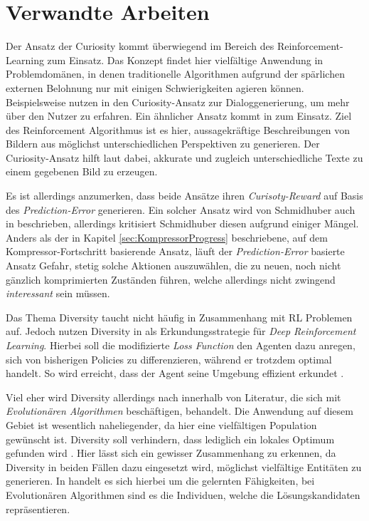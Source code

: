 
\section{Verwandte Arbeiten}
\label{sec:related}

Der Ansatz der Curiosity kommt überwiegend im Bereich des Reinforcement-Learning zum Einsatz. Das Konzept findet hier vielfältige Anwendung in Problemdomänen, in denen traditionelle Algorithmen aufgrund der spärlichen externen Belohnung nur mit einigen Schwierigkeiten agieren können. Beispielsweise nutzen \citeauthor{8683033} in \cite{8683033} den Curiosity-Ansatz zur Dialoggenerierung, um mehr über den Nutzer zu erfahren. Ein ähnlicher Ansatz kommt in \cite{luo2019curiositydriven} zum Einsatz. Ziel des Reinforcement Algorithmus ist es hier, aussagekräftige Beschreibungen von Bildern aus möglichst unterschiedlichen Perspektiven zu generieren. Der Curiosity-Ansatz hilft laut \citeauthor{luo2019curiositydriven} dabei, akkurate und zugleich unterschiedliche Texte zu einem gegebenen Bild zu erzeugen. 

Es ist allerdings anzumerken, dass beide Ansätze ihren \emph{Curisoty-Reward} auf Basis des \emph{Prediction-Error} generieren. Ein solcher Ansatz wird von Schmidhuber auch in \cite{curiosity_schmidhuber} beschrieben, allerdings kritisiert Schmidhuber diesen aufgrund einiger Mängel. Anders als der in Kapitel \ref{sec:KompressorProgress} beschriebene, auf dem Kompressor-Fortschritt basierende Ansatz, läuft der \emph{Prediction-Error} basierte Ansatz Gefahr, stetig solche Aktionen auszuwählen, die zu neuen, noch nicht gänzlich komprimierten Zuständen führen, welche allerdings nicht zwingend \emph{interessant} sein müssen. \cite{curiosity_schmidhuber}

\smallspace

Das Thema Diversity taucht nicht häufig in Zusammenhang mit RL Problemen auf. Jedoch nutzen \citeauthor{hong2018diversity} Diversity in \cite{hong2018diversity} als Erkundungsstrategie für \textit{Deep Reinforcement Learning}. Hierbei soll die modifizierte \textit{Loss Function} den Agenten dazu anregen, sich von bisherigen Policies zu differenzieren, während er trotzdem optimal handelt. So wird erreicht, dass der Agent seine Umgebung effizient erkundet \cite{hong2018diversity}.

Viel eher wird Diversity allerdings nach \cite{gabor2018inheritance} innerhalb von Literatur, die sich mit \textit{Evolutionären Algorithmen} beschäftigen, behandelt. Die Anwendung auf diesem Gebiet ist wesentlich naheliegender, da hier eine vielfältigen Population gewünscht ist. Diversity soll verhindern, dass lediglich ein lokales Optimum gefunden wird \cite{gabor2018inheritance}. Hier lässt sich ein gewisser Zusammenhang zu \cite{diversity_eysenbach} erkennen, da Diversity in beiden Fällen dazu eingesetzt wird, möglichst vielfältige Entitäten zu generieren. In \cite{diversity_eysenbach} handelt es sich hierbei um die gelernten Fähigkeiten, bei Evolutionären Algorithmen sind es die Individuen, welche die Lösungskandidaten repräsentieren.